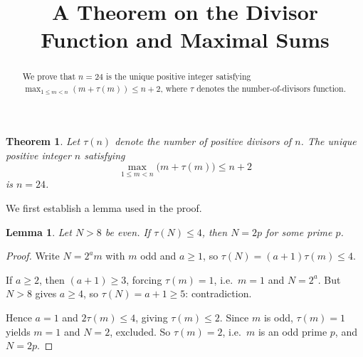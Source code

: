 \documentclass[11pt]{article}
\title{A Theorem on the Divisor Function and Maximal Sums}
\date{}
\newtheorem{theorem}{Theorem}
\newtheorem{lemma}{Lemma}
\begin{document}
\maketitle

\begin{abstract}
We prove that $n = 24$ is the unique positive integer satisfying
$\max_{1 \le m < n}(m + \tau(m)) \le n + 2$,
where $\tau$ denotes the number-of-divisors function.
\end{abstract}

\begin{theorem}\label{thm:main}
Let $\tau(n)$ denote the number of positive divisors of $n$.
The unique positive integer $n$ satisfying
\[
  \max_{1 \le m < n}\bigl(m + \tau(m)\bigr) \le n + 2
\]
is $n = 24$.
\end{theorem}

We first establish a lemma used in the proof.

\begin{lemma}\label{lem:2prime}
Let $N > 8$ be even. If $\tau(N) \le 4$, then $N = 2p$ for some prime $p$.
\end{lemma}

\begin{proof}
Write $N = 2^a m$ with $m$ odd and $a \ge 1$, so $\tau(N) = (a+1)\tau(m) \le 4$.

If $a \ge 2$, then $(a+1) \ge 3$, forcing $\tau(m) = 1$, i.e.\ $m = 1$ and
$N = 2^a$. But $N > 8$ gives $a \ge 4$, so $\tau(N) = a+1 \ge 5$: contradiction.

Hence $a = 1$ and $2\tau(m) \le 4$, giving $\tau(m) \le 2$.
Since $m$ is odd, $\tau(m) = 1$ yields $m = 1$ and $N = 2$, excluded.
So $\tau(m) = 2$, i.e.\ $m$ is an odd prime $p$, and $N = 2p$.
\end{proof}
\end{document}
